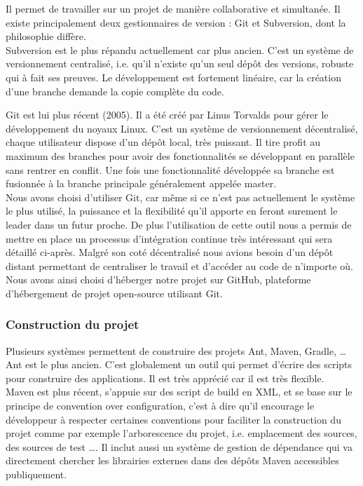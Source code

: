 Il permet de travailler sur un projet de manière collaborative et simultanée. Il existe principalement deux gestionnaires de version : Git et Subversion, dont la philosophie diffère.\\

Subversion est le plus répandu actuellement car plus ancien. C'est un système de versionnement centralisé, i.e. qu'il n'existe qu'un seul dépôt des versions, robuste qui à fait ses preuves. Le développement est fortement linéaire, car la création d'une branche demande la copie complète du code.

Git est lui plus récent (2005). Il a été créé par Linus Torvalds pour gérer le développement du noyaux Linux. C'est un système de versionnement décentralisé, chaque utilisateur dispose d'un dépôt local, très puissant. Il tire profit au maximum des branches pour avoir des fonctionnalités se développant en parallèle sans rentrer en conflit. Une fois une fonctionnalité développée sa branche est fusionnée à la branche principale généralement appelée master.\\

Nous avons choisi d'utiliser Git, car même si ce n'est pas actuellement le système le plus utilisé, la puissance et la flexibilité qu'il apporte en feront surement le leader dans un futur proche. De plus l'utilisation de cette outil nous a permis de mettre en place un processus d'intégration continue très intéressant qui sera détaillé ci-après. Malgré son coté décentralisé nous avions besoin d'un dépôt distant permettant de centraliser le travail et d'accéder au code de n'importe où. Nous avons ainsi choisi d'héberger notre projet sur GitHub, plateforme d'hébergement de projet open-source utilisant Git. 

\subsubsection{Construction du projet}

Plusieurs systèmes permettent de construire des projets Ant, Maven, Gradle, \dots{} Ant est le plus ancien. C'est globalement un outil qui permet d'écrire des scripts pour construire des applications. Il est très apprécié car il est très flexible.\\

Maven est plus récent, s'appuie sur des script de build en XML, et se base sur le principe de \flqq{}convention over configuration\frqq{}, c'est à dire qu'il encourage le développeur à respecter certaines conventions pour faciliter la construction du projet comme par exemple l'arborescence du projet, i.e. emplacement des sources, des sources de test \dots{}. Il inclut aussi un système de gestion de dépendance qui va directement chercher les librairies externes dans des dépôts Maven accessibles publiquement.\\

